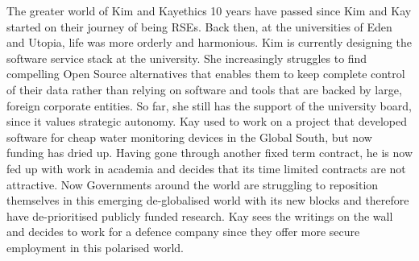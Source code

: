 \documentclass{eceasst}
\begin{document}
\begin{story}{The greater world of Kim and Kay}{ethics}
10 years have passed since Kim and Kay started on their journey of being RSEs. Back then,
at the universities of Eden and Utopia, life was more orderly and harmonious.
Kim is currently designing the software service stack at the university.
She increasingly struggles to find compelling Open Source alternatives that enables them to keep complete control of their data
rather than relying on software and tools that are backed by large, foreign corporate entities.
So far, she still has the support of the university board, since it values strategic autonomy.
Kay used to work on a project that developed
software for cheap water monitoring devices in the Global South, but now funding has dried up.
Having gone through another fixed term contract, he is now fed up
with work in academia and decides that its time limited contracts are not attractive.
Now Governments around the world are struggling to reposition themselves in this emerging de-globalised world with its new blocks and therefore have de-prioritised publicly funded research.
Kay sees the writings on the wall and decides to work for a defence company since they offer more secure employment in this polarised world.
\end{story}
\end{document}
